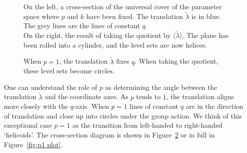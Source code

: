 \documentclass{article}
\numberwithin{equation}{section}
\numberwithin{figure}{section}
\begin{document}
\begin{figure}
{\begin{tikzpicture}
\end{tikzpicture}
}
    \caption{On the left, a cross-section of the universal cover of the parameter space where $p$ and $k$ have been fixed. The translation $\tilde{\lambda}$ is in blue. The grey lines are the lines of constant $q$.\\
    On the right, the result of taking the quotient by $\langle \tilde{\lambda}\rangle$. The plane has been rolled into a cylinder, and the level sets are now helices.\label{fig:level set quotient}}
\end{figure}
\begin{figure}
    
    \caption{When $p=1$, the translation $\tilde{\lambda}$ fixes $q$. When taking the quotient, these level sets become circles.\label{fig:level set quotient p1}}
\end{figure}

One can understand the role of $p$ as determining the angle between the translation $\tilde{\lambda}$ and the coordinate axes. As $p$ tends to $1$, the translation aligns more closely with the $q$-axis. When $p=1$ lines of constant $q$ are in the direction of translation and close up into circles under the group action. We think of this exceptional case $p=1$ as the transition from left-handed to right-handed `helicoids'. The cross-section diagram is shown in Figure~\ref{fig:level set quotient p1} or in full in Figure~\ref{fig:p1 plot}.
\end{document}
